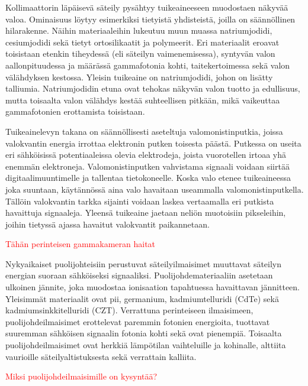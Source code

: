 Kollimaattorin läpäisevä säteily pysähtyy tuikeaineeseen muodostaen näkyvää valoa. Ominaisuus löytyy esimerkiksi tietyistä yhdisteistä, joilla on säännöllinen hilarakenne. Näihin materiaaleihin lukeutuu muun muassa natriumjodidi, cesiumjodidi sekä tietyt ortosilikaatit ja polymeerit. Eri materiaalit eroavat toisistaan etenkin tiheydessä (eli säteilyn vaimenemisessa), syntyvän valon aallonpituudessa ja määrässä gammafotonia kohti, taitekertoimessa sekä valon välähdyksen kestossa.\cite{knoll_radiation_2010} Yleisin tuikeaine on natriumjodidi, johon on lisätty talliumia\cite{cherry_gamma_2012, cherry_single_2012, knoll_radiation_2010}. Natriumjodidin etuna ovat tehokas näkyvän valon tuotto ja edullisuus, mutta toisaalta valon välähdys kestää suhteellisen pitkään, mikä vaikeuttaa gammafotonien erottamista toisistaan\cite{knoll_radiation_2010}.

Tuikeainelevyn takana on säännöllisesti aseteltuja valomonistinputkia, joissa valokvantin energia irrottaa elektronin putken toisesta päästä. Putkessa on useita eri sähköisissä potentiaaleissa olevia elektrodeja, joista vuorotellen irtoaa yhä enemmän elektroneja. Valomonistinputken vahvistama signaali voidaan siirtää digitaalimuuntimelle ja tallentaa tietokoneelle.\cite{cherry_gamma_2012, knoll_radiation_2010} Koska valo etenee tuikeaineessa joka suuntaan, käytännössä aina valo havaitaan useammalla valomonistinputkella. Tällöin valokvantin tarkka sijainti voidaan laskea vertaamalla eri putkista havaittuja signaaleja. Yleensä tuikeaine jaetaan neliön muotoisiin pikseleihin, joihin tietyssä ajassa havaitut valokvantit paikannetaan\cite{cherry_gamma_2012, knoll_radiation_2010}.

\textcolor{red}{Tähän perinteisen gammakameran haitat}

Nykyaikaiset puolijohteisiin perustuvat säteilyilmaisimet muuttavat säteilyn energian suoraan sähköiseksi signaaliksi. Puolijohdemateriaaliin asetetaan ulkoinen jännite, joka muodostaa ionisaation tapahtuessa havaittavan jännitteen. Yleisimmät materiaalit ovat pii, germanium, kadmiumtelluridi (CdTe) sekä kadmiumsinkkitelluridi (CZT). Verrattuna perinteiseen ilmaisimeen, puolijohdeilmaisimet erottelevat paremmin fotonien energioita, tuottavat suuremman sähköisen signaalin fotonia kohti sekä ovat pienempiä. Toisaalta puolijohdeilmaisimet ovat herkkiä lämpötilan vaihteluille ja kohinalle, alttiita vaurioille säteilyaltistuksesta sekä verrattain kalliita.\cite{knoll_radiation_2010, slomka_novel_2022}

\textcolor{red}{Miksi puolijohdeilmaisimille on kysyntää?}